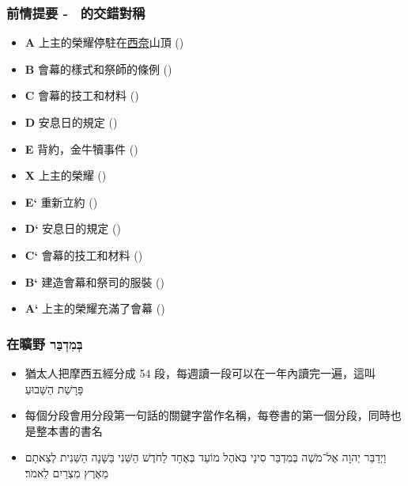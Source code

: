 \documentclass{beamer}
\begin{document}
\begin{frame}
  \frametitle{前情提要 - \ 的交錯對稱\ \parencite{Chiasm_Exodus_24-40}}
  \begin{itemize}
    \item \textbf{A} 上主的榮耀停駐在\uline{西奈}山頂 ()
    \item \textbf{B} 會幕的樣式和祭師的條例 ()
    \item \textbf{C} 會幕的技工和材料 ()
    \item \textbf{D} 安息日的規定 ()
    \item \textbf{E} 背約，金牛犢事件 ()
    \item \textbf{X} 上主的榮耀 ()
    \item \textbf{E`} 重新立約 ()
    \item \textbf{D`} 安息日的規定 ()
    \item \textbf{C`} 會幕的技工和材料 ()
    \item \textbf{B`} 建造會幕和祭司的服裝 ()
    \item \textbf{A`} 上主的榮耀充滿了會幕 ()
  \end{itemize}
\end{frame}

\begin{frame}
  \frametitle{在曠野 \texthebrew{בְּמִדְבַּר}}
  \begin{itemize}
    \item 猶太人把摩西五經分成 54 段，每週讀一段可以在一年內讀完一遍，這叫 \texthebrew{פָּרָשַׁת הַשָּׁבוּעַ}\ \parencite{WeeklyTorahPortion}
    \item 每個分段會用分段第一句話的關鍵字當作名稱，每卷書的第一個分段，同時也是整本書的書名
    \item
      \begin{hebrew}
        וַיְדַבֵּר יְהוָה אֶל־מֹשֶׁה \alert{בְּמִדְבַּר} סִינַי בְּאֹהֶל מוֹעֵד בְּאֶחָד לַחֹדֶשׁ הַשֵּׁנִי בַּשָּׁנָה הַשֵּׁנִית לְצֵאתָם מֵאֶרֶץ מִצְרַיִם לֵאמֹר׃
      \end{hebrew}
  \end{itemize}
\end{frame}
\end{document}

